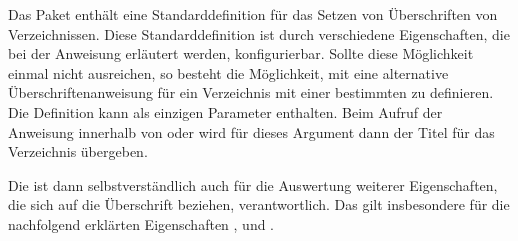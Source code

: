 \begin{Declaration}
\end{Declaration}
Das Paket  enthält eine Standarddefinition für das Setzen
von Überschriften von Verzeichnissen. Diese Standarddefinition ist durch
verschiedene Eigenschaften, die bei der Anweisung
 erläutert werden, konfigurierbar. Sollte
diese Möglichkeit einmal nicht ausreichen, so besteht die Möglichkeit, mit
 eine alternative Überschriftenanweisung für ein
Verzeichnis mit einer bestimmten  zu definieren. Die
Definition kann als einzigen Parameter  enthalten. Beim Aufruf der
Anweisung innerhalb von  oder
 wird für dieses Argument dann der Titel
für das Verzeichnis übergeben.

Die  ist dann selbstverständlich auch für die Auswertung
weiterer Eigenschaften, die sich auf die Überschrift beziehen,
verantwortlich. Das gilt insbesondere für die nachfolgend erklärten
Eigenschaften ,  und .%
\EndIndexGroup


